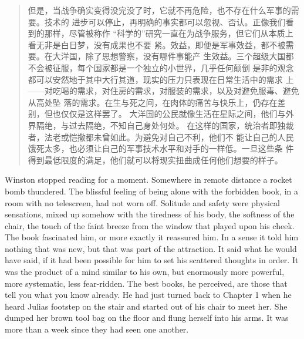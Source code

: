 \begin{paracol}{2}
\switchcolumn

\begin{quotation}
但是，当战争确实变得没完没了时，它就不再危险，也不存在什么军事的需要。技术的
进步可以停止，再明确的事实都可以忽视、否认。正像我们看到的那样，尽管被称作
``科学的''研究一直在为战争服务，但它们从本质上看无非是白日梦，没有成果也不要
紧。效益，即便是军事效益，都不被需要。在大洋国，除了思想警察，没有哪件事能产
生效益。三个超级大国都不会被征服，每个国家都是一个独立的小世界，几乎任何颠倒
是非的观念都可以安然地于其中大行其道，现实的压力只表现在日常生活中的需求
上——对吃喝的需求，对住房的需求，对服装的需求，以及对避免服毒、避免从高处坠
落的需求。在生与死之间，在肉体的痛苦与快乐上，仍存在差别，但也仅仅是这样罢了。
大洋国的公民就像生活在星际之间，他们与外界隔绝，与过去隔绝，不知自己身处何处。
在这样的国家，统治者即独裁者，法老或恺撒都未曾如此。为避免对自己不利，他们不
能让自己的人民饿死太多，也必须让自己的军事技术水平和对手的一样低。一旦这些条
件得到最低限度的满足，他们就可以将现实扭曲成任何他们想要的样子。
\end{quotation}

\switchcolumn*

Winston stopped reading for a moment. Somewhere in remote distance a
rocket bomb thundered. The blissful feeling of being alone with the
forbidden book, in a room with no telescreen, had not worn off. Solitude
and safety were physical sensations, mixed up somehow with the tiredness
of his body, the softness of the chair, the touch of the faint breeze
from the window that played upon his cheek. The book fascinated him, or
more exactly it reassured him. In a sense it told him nothing that was
new, but that was part of the attraction. It said what he would have
said, if it had been possible for him to set his scattered thoughts in
order. It was the product of a mind similar to his own, but enormously
more powerful, more systematic, less fear-ridden. The best books, he
perceived, are those that tell you what you know already. He had just
turned back to Chapter 1 when he heard Julia\textquotesingle s footstep
on the stair and started out of his chair to meet her. She dumped her
brown tool bag on the floor and flung herself into his arms. It was more
than a week since they had seen one another.

\switchcolumn


\end{paracol}
